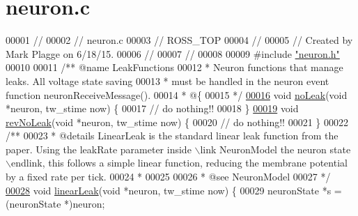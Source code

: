 \hypertarget{neuron_8c_source}{}\section{neuron.\+c}
\label{neuron_8c_source}

\begin{DoxyCode}
00001 \textcolor{comment}{//}
00002 \textcolor{comment}{//  neuron.c}
00003 \textcolor{comment}{//  ROSS\_TOP}
00004 \textcolor{comment}{//}
00005 \textcolor{comment}{//  Created by Mark Plagge on 6/18/15.}
00006 \textcolor{comment}{//}
00007 \textcolor{comment}{//}
00008 
00009 \textcolor{preprocessor}{#}\textcolor{preprocessor}{include} \hyperlink{neuron_8h}{"neuron.h"}
00010 
00011 \textcolor{comment}{/** @name LeakFunctions}
00012 \textcolor{comment}{ * Neuron functions that manage leaks. All voltage state saving}
00013 \textcolor{comment}{ * must be handled in the neuron event function neuronReceiveMessage().}
00014 \textcolor{comment}{ * @\{}
00015 \textcolor{comment}{ */}
\hypertarget{neuron_8c_source_l00016}{}\hyperlink{neuron_8h_a8e52befc10f975c6be39cc93af573d7e}{00016} \textcolor{keywordtype}{void} \hyperlink{neuron_8h_a8e52befc10f975c6be39cc93af573d7e}{noLeak}(\textcolor{keywordtype}{void} *neuron, tw\_stime now) \{
00017   \textcolor{comment}{// do nothing!!}
00018 \}
\hypertarget{neuron_8c_source_l00019}{}\hyperlink{neuron_8h_ac5bebec77c5216533ec5f6acd086532e}{00019} \textcolor{keywordtype}{void} \hyperlink{neuron_8h_ac5bebec77c5216533ec5f6acd086532e}{revNoLeak}(\textcolor{keywordtype}{void} *neuron, tw\_stime now) \{
00020   \textcolor{comment}{// do nothing!!}
00021 \}
00022 \textcolor{comment}{/**}
00023 \textcolor{comment}{ *  @details LinearLeak is the standard linear leak function from the paper. Using the leakRate
       parameter inside \(\backslash\)link NeuronModel the neuron state \(\backslash\)endlink, this follows a simple linear function, reducing the
       membrane potential by a fixed rate per tick.}
00024 \textcolor{comment}{ *}
00025 \textcolor{comment}{}
00026 \textcolor{comment}{ *  @see NeuronModel}
00027 \textcolor{comment}{ */}
\hypertarget{neuron_8c_source_l00028}{}\hyperlink{neuron_8h_a64dc379b459a2b07b40bce35381210e8}{00028} \textcolor{keywordtype}{void} \hyperlink{neuron_8h_a64dc379b459a2b07b40bce35381210e8}{linearLeak}(\textcolor{keywordtype}{void} *neuron, tw\_stime now) \{
00029     neuronState *s = (neuronState *)neuron;

\end{DoxyCode}
